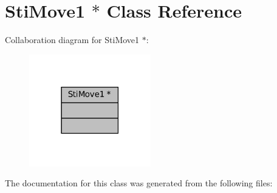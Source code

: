 \hypertarget{classStiMove1_01_5}{}\section{Sti\+Move1 $\ast$ Class Reference}
\label{classStiMove1_01_5}


Collaboration diagram for Sti\+Move1 $\ast$\+:
\nopagebreak
\begin{figure}[H]
\begin{center}
\leavevmode
\includegraphics[width=150pt]{classStiMove1_01_5__coll__graph}
\end{center}
\end{figure}


The documentation for this class was generated from the following files\+: